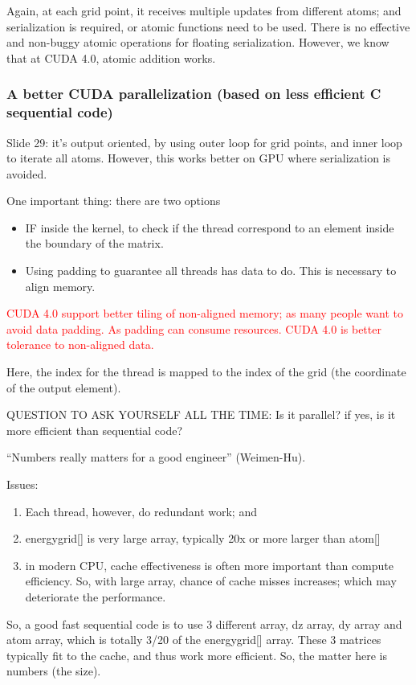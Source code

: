 Again, at each grid point, it receives multiple updates from different
atoms; and serialization is required, or atomic functions need to be
used. There is no effective and non-buggy atomic operations for
floating serialization. However, we know that at CUDA 4.0, atomic
addition works.

\subsubsection{A better CUDA parallelization (based on less efficient C sequential code)}
\label{sec:bett-cuda-parall}

Slide 29: it's output oriented, by using outer loop for grid points,
and inner loop to iterate all atoms. However, this works better on
GPU where serialization is avoided. 

One important thing: there are two options
\begin{itemize}
\item IF inside the kernel, to check if the thread correspond to an
  element inside the boundary of the matrix.
\item Using padding to guarantee all threads has data to do. This is necessary to align memory. 
\end{itemize}

\textcolor{red}{CUDA 4.0 support better tiling of non-aligned memory;
  as many people want to avoid data padding. As padding can consume
  resources. CUDA 4.0 is better tolerance to non-aligned data.}

Here, the index for the thread is mapped to the index of the grid (the
coordinate of the output element). 

QUESTION TO ASK YOURSELF ALL THE TIME: Is it parallel? if yes, is it
more efficient than sequential code?

``Numbers really matters for a good engineer'' (Weimen-Hu).

Issues:
\begin{enumerate}
\item Each thread, however, do redundant work; and
\item energygrid[] is very large array, typically 20x or more larger
  than atom[]
\item in modern CPU, cache effectiveness is often more important than
  compute efficiency. So, with large array, chance of cache misses
  increases; which may deteriorate the performance. 
\end{enumerate}

So, a good fast sequential code is to use 3 different array, dz array,
dy array and atom array, which is totally 3/20 of the energygrid[]
array. These 3 matrices typically fit to the cache, and thus work more
efficient. So, the matter here is numbers (the size). 

